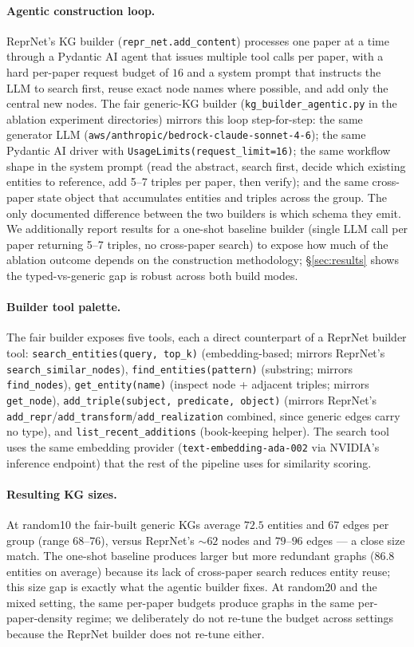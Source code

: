 \documentclass[10pt,twocolumn]{article}
\begin{document}
\paragraph{Agentic construction loop.}  ReprNet's KG builder
(\texttt{repr\_net.add\_content}) processes one paper at a time
through a Pydantic AI agent that issues multiple tool calls per
paper, with a hard per-paper request budget of $16$ and a system
prompt that instructs the LLM to search first, reuse exact node
names where possible, and add only the central new nodes.  The
fair generic-KG builder (\texttt{kg\_builder\_agentic.py} in the
ablation experiment directories) mirrors this loop step-for-step:
the same generator LLM
(\texttt{aws/anthropic/bedrock-claude-sonnet-4-6}); the same
Pydantic AI driver with
\texttt{UsageLimits(request\_limit=16)}; the same workflow shape
in the system prompt (read the abstract, search first, decide
which existing entities to reference, add 5--7 triples per paper,
then verify); and the same cross-paper state object that
accumulates entities and triples across the group.  The only
documented difference between the two builders is which schema
they emit.  We additionally report results for a one-shot baseline
builder (single LLM call per paper returning 5--7 triples, no
cross-paper search) to expose how much of the ablation outcome
depends on the construction methodology; \S\ref{sec:results}
shows the typed-vs-generic gap is robust across both build modes.

\paragraph{Builder tool palette.}  The fair builder exposes five
tools, each a direct counterpart of a ReprNet builder tool:
\texttt{search\_entities(query, top\_k)} (embedding-based; mirrors
ReprNet's \texttt{search\_similar\_nodes}),
\texttt{find\_entities(pattern)} (substring; mirrors
\texttt{find\_nodes}),
\texttt{get\_entity(name)} (inspect node + adjacent triples;
mirrors \texttt{get\_node}),
\texttt{add\_triple(subject, predicate, object)} (mirrors
ReprNet's \texttt{add\_repr}/\texttt{add\_transform}/\texttt{add\_realization}
combined, since generic edges carry no type), and
\texttt{list\_recent\_additions} (book-keeping helper).  The
search tool uses the same embedding provider
(\texttt{text-embedding-ada-002} via NVIDIA's inference endpoint)
that the rest of the pipeline uses for similarity scoring.

\paragraph{Resulting KG sizes.}  At random10 the fair-built
generic KGs average $72.5$ entities and $67$ edges per group
(range $68$--$76$), versus ReprNet's $\sim62$ nodes and $79$--$96$
edges --- a close size match.  The one-shot baseline produces
larger but more redundant graphs ($86.8$ entities on average)
because its lack of cross-paper search reduces entity reuse; this
size gap is exactly what the agentic builder fixes.  At random20
and the mixed setting, the same per-paper budgets produce graphs
in the same per-paper-density regime; we deliberately do not
re-tune the budget across settings because the ReprNet builder
does not re-tune either.
\end{document}
